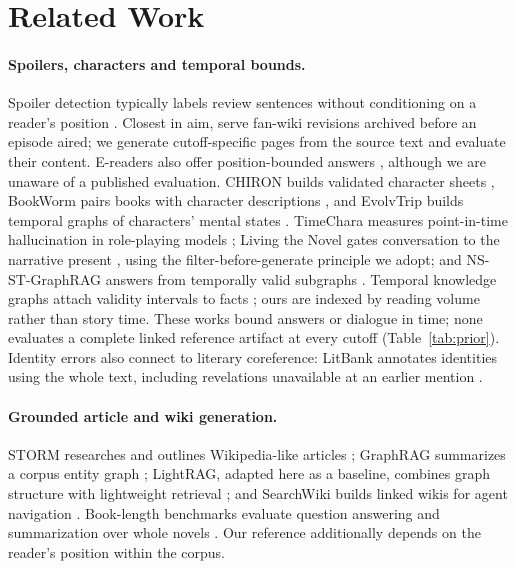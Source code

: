 \section{Related Work}
\label{sec:related}

\paragraph{Spoilers, characters and temporal bounds.}
Spoiler detection typically labels review sentences without conditioning on a reader's
position \citep{wan2019spoiler}. Closest in aim, \citet{jones2018spoilers} serve fan-wiki
revisions archived before an episode aired; we generate cutoff-specific pages from the
source text and evaluate their content. E-readers also offer position-bounded answers
\citep{amazon2025kindle}, although we are unaware of a published evaluation.
CHIRON builds validated character sheets \citep{gurung2024chiron}, BookWorm pairs books with
character descriptions \citep{papoudakis2024bookworm}, and EvolvTrip builds temporal graphs
of characters' mental states \citep{yang2025evolvtrip}. TimeChara measures point-in-time
hallucination in role-playing models \citep{ahn2024timechara}; Living the Novel gates
conversation to the narrative present \citep{huang2025living}, using the
filter-before-generate principle we adopt; and NS-ST-GraphRAG answers from temporally valid
subgraphs \citep{lin2026nsst}. Temporal knowledge graphs attach validity intervals to facts
\citep{dasgupta2018hyte}; ours are indexed by reading volume rather than story time. These
works bound answers or dialogue in time; none evaluates a complete linked reference artifact
at every cutoff (Table~\ref{tab:prior}). Identity errors also connect to literary
coreference: LitBank annotates identities using the whole text, including revelations
unavailable at an earlier mention \citep{bamman2020litbank}.

\paragraph{Grounded article and wiki generation.}
STORM researches and outlines Wikipedia-like articles \citep{shao2024storm}; GraphRAG
summarizes a corpus entity graph \citep{edge2024graphrag}; LightRAG, adapted here as a
baseline, combines graph structure with lightweight retrieval \citep{guo2024lightrag}; and
SearchWiki builds linked wikis for agent navigation \citep{singh2026searchwiki}. Book-length
benchmarks evaluate question answering and summarization over whole novels
\citep{wang2024novelqa,chang2024booookscore}. Our reference additionally depends on the
reader's position within the corpus.

